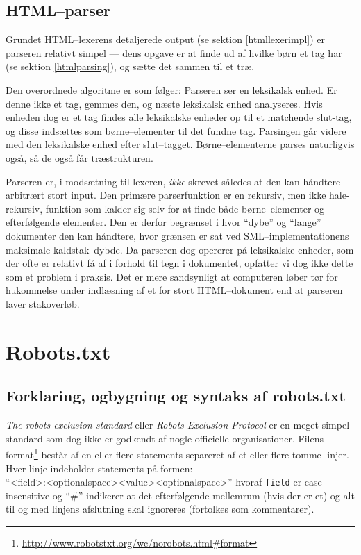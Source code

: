 \documentclass[a4paper,oneside]{memoir}
\begin{document}
\subsection{HTML--parser}

Grundet HTML--lexerens detaljerede output (se sektion
\ref{htmllexerimpl}) er parseren relativt simpel --- dens opgave er at
finde ud af hvilke børn et tag har (se sektion \ref{htmlparsing}), og
sætte det sammen til et træ.

Den overordnede algoritme er som følger: Parseren ser en leksikalsk
enhed. Er denne ikke et tag, gemmes den, og næste leksikalsk enhed
analyseres. Hvis enheden dog er et tag findes alle leksikalske enheder
op til et matchende slut-tag, og disse indsættes som børne--elementer
til det fundne tag. Parsingen går videre med den leksikalske enhed
efter slut--tagget. Børne--elementerne parses naturligvis også, så de
også får træstrukturen.

Parseren er, i modsætning til lexeren, \textit{ikke} skrevet således
at den kan håndtere arbitrært stort input. Den primære parserfunktion
er en rekursiv, men ikke hale-rekursiv, funktion som kalder sig selv
for at finde både børne--elementer og efterfølgende elementer. Den er
derfor begrænset i hvor ``dybe'' og ``lange'' dokumenter den kan
håndtere, hvor grænsen er sat ved SML--implementationens maksimale
kaldstak--dybde. Da parseren dog opererer på leksikalske enheder, som
der ofte er relativt få af i forhold til tegn i dokumentet, opfatter
vi dog ikke dette som et problem i praksis. Det er mere sandsynligt at
computeren løber tør for hukommelse under indlæsning af et for stort
HTML--dokument end at parseren laver stakoverløb.

\section{Robots.txt}
\label{Robots} 


\subsection{Forklaring, ogbygning og syntaks af robots.txt}

\textit{The robots exclusion standard} eller \textit{Robots Exclusion Protocol}
er en meget simpel standard som dog ikke er godkendt af nogle officielle
organisationer. 
Filens format\footnote{\url{http://www.robotstxt.org/wc/norobots.html\#format}}
består af en eller flere statements separeret af et eller flere tomme linjer.
Hver linje indeholder statements på formen:\\
``<field>:<optionalspace><value><optionalspace>'' hvoraf \texttt{field} er case
insensitive og ``\#'' indikerer at det efterfølgende mellemrum (hvis der er et)
og alt til og med linjens afslutning skal ignoreres (fortolkes som kommentarer).
\end{document}

